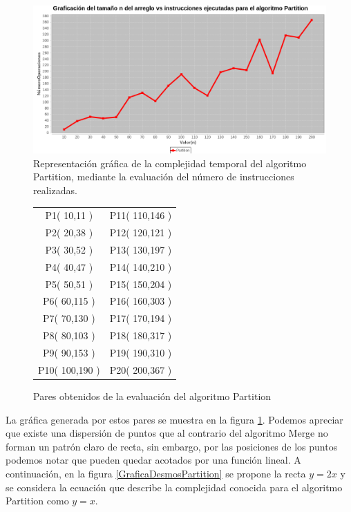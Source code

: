         \begin{figure}[h!]
            \centering
            \includegraphics[width=13cm]{QuickSort/graf-partition.png}
            \caption{Representación gráfica de la complejidad temporal del algoritmo Partition, mediante la evaluación del número de instrucciones realizadas.}
            \label{GraficaPartition}
        \end{figure}
        
        \begin{figure}[h!]
            \centering
            \begin{tabular}{c|c}
                    P1( 10,11 ) & P11( 110,146 )\\
                    P2( 20,38 ) & P12( 120,121 )\\
                    P3( 30,52 ) & P13( 130,197 )\\
                    P4( 40,47 ) & P14( 140,210 )\\
                    P5( 50,51 ) & P15( 150,204 )\\
                    P6( 60,115 ) & P16( 160,303 )\\
                    P7( 70,130 ) & P17( 170,194 )\\
                    P8( 80,103 ) & P18( 180,317 )\\
                    P9( 90,153 ) & P19( 190,310 )\\
                    P10( 100,190 ) & P20( 200,367 )\\
            \end{tabular}
            \caption{Pares obtenidos de la evaluación del algoritmo Partition}
            \label{PuntosPartition}
        \end{figure}
        
        La gráfica generada por estos pares se muestra en la figura \ref{GraficaPartition}. Podemos apreciar que existe una dispersión de puntos que al contrario del algoritmo Merge no forman un patrón claro de recta, sin embargo, por las posiciones de los puntos podemos notar que pueden quedar acotados por una función lineal. A continuación, en la figura \ref{GraficaDesmosPartition} se propone la recta $y=2x$ y se considera la ecuación que describe la complejidad conocida para el algoritmo Partition como $y=x$.
        

